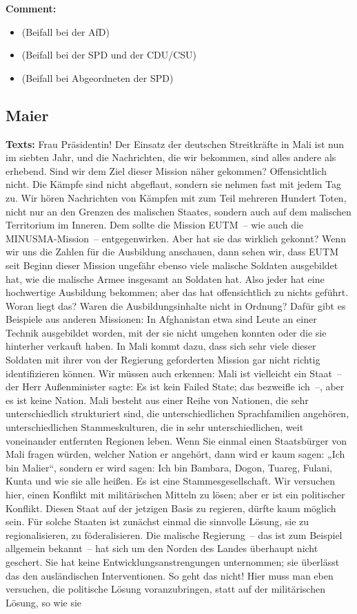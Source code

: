 \documentclass{article}
\begin{document}
\noindent\textbf{Comment:}
\begin{itemize}
    \setlength\itemsep{-3pt}
    \item (Beifall bei der AfD)
    \setlength\itemsep{-3pt}
    \item (Beifall bei der SPD und der CDU/CSU)
    \setlength\itemsep{-3pt}
    \item (Beifall bei Abgeordneten der SPD)
\end{itemize}
\subsection{Maier}
\noindent\textbf{Texts:} Frau Präsidentin! Der Einsatz der deutschen Streitkräfte in Mali ist nun im siebten Jahr, und die Nachrichten, die wir bekommen, sind alles andere als erhebend. Sind wir dem Ziel dieser Mission näher gekommen? Offensichtlich nicht. Die Kämpfe sind nicht abgeflaut, sondern sie nehmen fast mit jedem Tag zu. Wir hören Nachrichten von Kämpfen mit zum Teil mehreren Hundert Toten, nicht nur an den Grenzen des malischen Staates, sondern auch auf dem malischen Territorium im Inneren. Dem sollte die Mission EUTM – wie auch die MINUSMA-Mission – entgegenwirken. Aber hat sie das wirklich gekonnt? Wenn wir uns die Zahlen für die Ausbildung anschauen, dann sehen wir, dass EUTM seit Beginn dieser Mission ungefähr ebenso viele malische Soldaten ausgebildet hat, wie die malische Armee insgesamt an Soldaten hat. Also jeder hat eine hochwertige Ausbildung bekommen; aber das hat offensichtlich zu nichts geführt. Woran liegt das? Waren die Ausbildungsinhalte nicht in Ordnung? Dafür gibt es Beispiele aus anderen Missionen: In Afghanistan etwa sind Leute an einer Technik ausgebildet worden, mit der sie nicht umgehen konnten oder die sie hinterher verkauft haben. In Mali kommt dazu, dass sich sehr viele dieser Soldaten mit ihrer von der Regierung geforderten Mission gar nicht richtig identifizieren können. Wir müssen auch erkennen: Mali ist vielleicht ein Staat – der Herr Außenminister sagte: Es ist kein Failed State; das bezweifle ich –, aber es ist keine Nation. Mali besteht aus einer Reihe von Nationen, die sehr unterschiedlich strukturiert sind, die unterschiedlichen Sprachfamilien angehören, unterschiedlichen Stammeskulturen, die in sehr unterschiedlichen, weit voneinander entfernten Regionen leben. Wenn Sie einmal einen Staatsbürger von Mali fragen würden, welcher Nation er angehört, dann wird er kaum sagen: „Ich bin Malier“, sondern er wird sagen: Ich bin Bambara, Dogon, Tuareg, Fulani, Kunta und wie sie alle heißen. Es ist eine Stammesgesellschaft. Wir versuchen hier, einen Konflikt mit militärischen Mitteln zu lösen; aber er ist ein politischer Konflikt. Diesen Staat auf der jetzigen Basis zu regieren, dürfte kaum möglich sein.  Für solche Staaten ist zunächst einmal die sinnvolle Lösung, sie zu regionalisieren, zu föderalisieren. Die malische Regierung – das ist zum Beispiel allgemein bekannt – hat sich um den Norden des Landes überhaupt nicht geschert.  Sie hat keine Entwicklungsanstrengungen unternommen; sie überlässt das den ausländischen Interventionen. So geht das nicht! Hier muss man eben versuchen, die politische Lösung voranzubringen, statt auf der militärischen Lösung, so wie sie 
\end{document}
